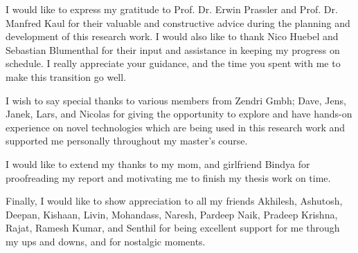 

    \begin{acknowledgements}
		I would like to express my gratitude to Prof. Dr. Erwin Prassler and Prof. Dr. Manfred Kaul for their valuable and constructive advice during the planning and development of this research work. I would also like to thank Nico Huebel and Sebastian Blumenthal for their input and assistance in keeping my progress on schedule. I really appreciate your guidance, and the time you spent with me to make this transition go well.
		
		I wish to say special thanks to various members from Zendri Gmbh; Dave, Jens, Janek, Lars, and Nicolas for giving the opportunity to explore and have hands-on experience on novel technologies which are being used in this research work and supported me personally throughout my master's course.
		
		I would like to extend my thanks to my mom, and girlfriend Bindya for proofreading my report and motivating me to finish my thesis work on time.
		
		Finally, I would like to show appreciation to all my friends Akhilesh, Ashutosh, Deepan, Kishaan, Livin, Mohandass, Naresh, Pardeep Naik, Pradeep Krishna, Rajat, Ramesh Kumar, and Senthil for being excellent support for me through my ups and downs, and for nostalgic moments.

    \end{acknowledgements}

